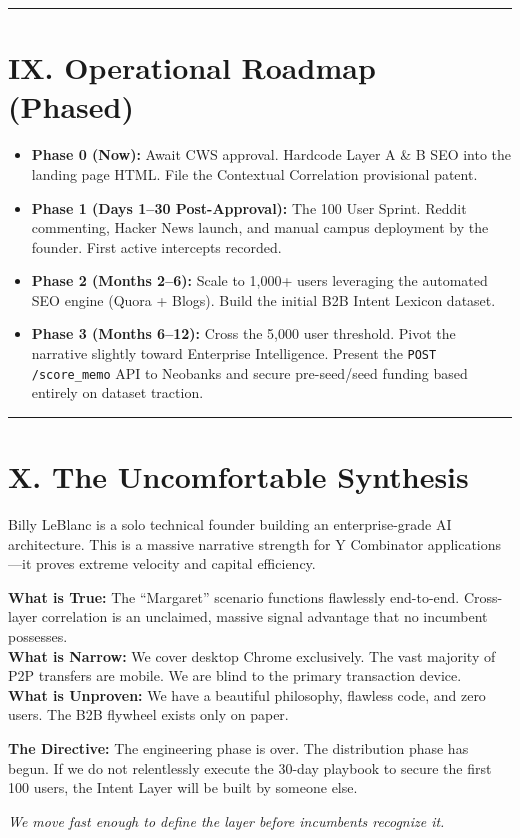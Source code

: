 \documentclass[11pt, letterpaper]{article}
\begin{document}
\vspace{12pt}
\hrule
\vspace{12pt}

\section*{IX. Operational Roadmap (Phased)}

\begin{itemize}
    \item \textbf{Phase 0 (Now):} Await CWS approval. Hardcode Layer A \& B SEO into the landing page HTML. File the Contextual Correlation provisional patent.
    \item \textbf{Phase 1 (Days 1–30 Post-Approval):} The 100 User Sprint. Reddit commenting, Hacker News launch, and manual campus deployment by the founder. First active intercepts recorded.
    \item \textbf{Phase 2 (Months 2–6):} Scale to 1,000+ users leveraging the automated SEO engine (Quora + Blogs). Build the initial B2B Intent Lexicon dataset. 
    \item \textbf{Phase 3 (Months 6–12):} Cross the 5,000 user threshold. Pivot the narrative slightly toward Enterprise Intelligence. Present the \texttt{POST /score\_memo} API to Neobanks and secure pre-seed/seed funding based entirely on dataset traction.
\end{itemize}

\vspace{12pt}
\hrule
\vspace{12pt}

\section*{X. The Uncomfortable Synthesis}

Billy LeBlanc is a solo technical founder building an enterprise-grade AI architecture. This is a massive narrative strength for Y Combinator applications—it proves extreme velocity and capital efficiency. 

\textbf{What is True:} The ``Margaret'' scenario functions flawlessly end-to-end. Cross-layer correlation is an unclaimed, massive signal advantage that no incumbent possesses.\\
\textbf{What is Narrow:} We cover desktop Chrome exclusively. The vast majority of P2P transfers are mobile. We are blind to the primary transaction device.\\
\textbf{What is Unproven:} We have a beautiful philosophy, flawless code, and zero users. The B2B flywheel exists only on paper. 

\textbf{The Directive:} The engineering phase is over. The distribution phase has begun. If we do not relentlessly execute the 30-day playbook to secure the first 100 users, the Intent Layer will be built by someone else. 

\textit{We move fast enough to define the layer before incumbents recognize it.}
\end{document}
